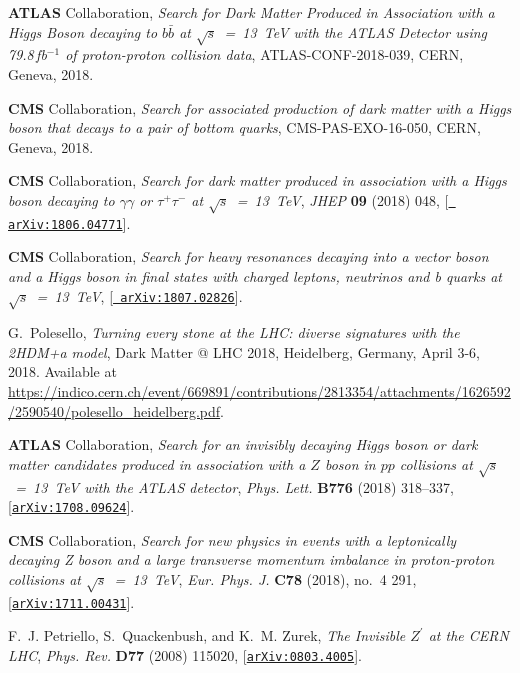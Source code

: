 \documentclass[a4paper, 11pt,notoc]{article}
\begin{document}
\begin{thebibliography}{100}
{\bf ATLAS} Collaboration, {\it {Search for Dark Matter Produced in Association
  with a Higgs Boson decaying to $b\bar{b}$ at $\sqrt{s}$~=~13~TeV with the
  ATLAS Detector using 79.8$\,$fb$^{-1}$ of proton-proton collision data}},
 ATLAS-CONF-2018-039, CERN, Geneva, 2018.

{\bf CMS} Collaboration, {\it {Search for associated production of dark matter
  with a Higgs boson that decays to a pair of bottom quarks}},  
  CMS-PAS-EXO-16-050, CERN, Geneva, 2018.

{\bf CMS} Collaboration, {\it {Search for dark matter produced in association with a
                        Higgs boson decaying to $\gamma\gamma$ or $\tau^+\tau^-$
                        at $\sqrt{s}$~=~13~TeV}},  {\em JHEP} {\bf 09} (2018) 048, [\href{http://arxiv.org/abs/1806.04771}{{\tt
  arXiv:1806.04771}}].
  
{\bf CMS} Collaboration, {\it {Search for heavy resonances decaying into a vector boson
                        and a Higgs boson in final states with charged leptons,
                        neutrinos and b quarks at $\sqrt{s}$~=~13~TeV}}, [\href{http://arxiv.org/abs/1807.02826}{{\tt
  arXiv:1807.02826}}].  

G.~Polesello, {\it {Turning every stone at the LHC: diverse signatures with the
  2HDM+a model}},  {Dark Matter @ LHC 2018, Heidelberg, Germany,
  April 3-6, 2018}.
\newblock Available at
  \url{https://indico.cern.ch/event/669891/contributions/2813354/attachments/1626592/2590540/polesello_heidelberg.pdf}.

{\bf ATLAS} Collaboration, {\it {Search for an invisibly
  decaying Higgs boson or dark matter candidates produced in association with a
  $Z$ boson in $pp$ collisions at $\sqrt{s}$~=~13~TeV with the ATLAS
  detector}},  {\em Phys. Lett.} {\bf B776} (2018) 318--337,
  [\href{http://arxiv.org/abs/1708.09624}{{\tt arXiv:1708.09624}}].

{\bf CMS} Collaboration, {\it {Search for new physics in
  events with a leptonically decaying Z boson and a large transverse momentum
  imbalance in proton-proton collisions at $\sqrt{s}$~=~13~TeV}},
  {\em Eur. Phys. J.} {\bf C78} (2018), no.~4 291,
  [\href{http://arxiv.org/abs/1711.00431}{{\tt arXiv:1711.00431}}].

F.~J. Petriello, S.~Quackenbush, and K.~M. Zurek, {\it {The Invisible
  $Z^\prime$ at the CERN LHC}},  {\em Phys. Rev.} {\bf D77} (2008) 115020,
  [\href{http://arxiv.org/abs/0803.4005}{{\tt arXiv:0803.4005}}].


\end{thebibliography}
\end{document}
